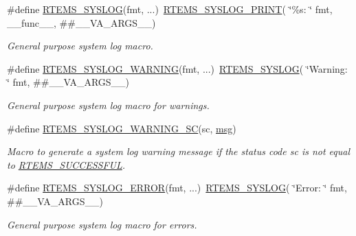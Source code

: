 \begin{Indent}
\begin{DoxyCompactItemize}
\#define \mbox{\hyperlink{group__rtems__status__checks_gaef4ebaf61bb2bf34d06967af636701c2}{R\+T\+E\+M\+S\+\_\+\+S\+Y\+S\+L\+OG}}(fmt, ...)~\mbox{\hyperlink{group__rtems__status__checks_gae6366e5dd71c9ba9d8cd7d3688b2f6ef}{R\+T\+E\+M\+S\+\_\+\+S\+Y\+S\+L\+O\+G\+\_\+\+P\+R\+I\+NT}}( \char`\"{}\%s\+: \char`\"{} fmt, \+\_\+\+\_\+func\+\_\+\+\_\+, \#\#\+\_\+\+\_\+\+V\+A\+\_\+\+A\+R\+G\+S\+\_\+\+\_\+)
\begin{DoxyCompactList}\small\item\em General purpose system log macro. \end{DoxyCompactList}\item 
\#define \mbox{\hyperlink{group__rtems__status__checks_gad55c5ed5bf61f5554c580e43104ee5af}{R\+T\+E\+M\+S\+\_\+\+S\+Y\+S\+L\+O\+G\+\_\+\+W\+A\+R\+N\+I\+NG}}(fmt, ...)~\mbox{\hyperlink{group__rtems__status__checks_gaef4ebaf61bb2bf34d06967af636701c2}{R\+T\+E\+M\+S\+\_\+\+S\+Y\+S\+L\+OG}}( \char`\"{}Warning\+: \char`\"{} fmt, \#\#\+\_\+\+\_\+\+V\+A\+\_\+\+A\+R\+G\+S\+\_\+\+\_\+)
\begin{DoxyCompactList}\small\item\em General purpose system log macro for warnings. \end{DoxyCompactList}\item 
\#define \mbox{\hyperlink{group__rtems__status__checks_ga9cad738b200af0ab721806aab7f25b41}{R\+T\+E\+M\+S\+\_\+\+S\+Y\+S\+L\+O\+G\+\_\+\+W\+A\+R\+N\+I\+N\+G\+\_\+\+SC}}(sc,  \mbox{\hyperlink{structmsg}{msg}})
\begin{DoxyCompactList}\small\item\em Macro to generate a system log warning message if the status code {\itshape sc} is not equal to \mbox{\hyperlink{group__ClassicStatus_gga545d41846817eaba6143d52ee4d9e9fea8a23e2d94778f09399da984d73562536}{R\+T\+E\+M\+S\+\_\+\+S\+U\+C\+C\+E\+S\+S\+F\+UL}}. \end{DoxyCompactList}\item 
\#define \mbox{\hyperlink{group__rtems__status__checks_ga297efcfefcb8a3bf4dec6585a4884136}{R\+T\+E\+M\+S\+\_\+\+S\+Y\+S\+L\+O\+G\+\_\+\+E\+R\+R\+OR}}(fmt, ...)~\mbox{\hyperlink{group__rtems__status__checks_gaef4ebaf61bb2bf34d06967af636701c2}{R\+T\+E\+M\+S\+\_\+\+S\+Y\+S\+L\+OG}}( \char`\"{}Error\+: \char`\"{} fmt, \#\#\+\_\+\+\_\+\+V\+A\+\_\+\+A\+R\+G\+S\+\_\+\+\_\+)
\begin{DoxyCompactList}\small\item\em General purpose system log macro for errors. \end{DoxyCompactList}\item 

\end{DoxyCompactItemize}
\end{Indent}
